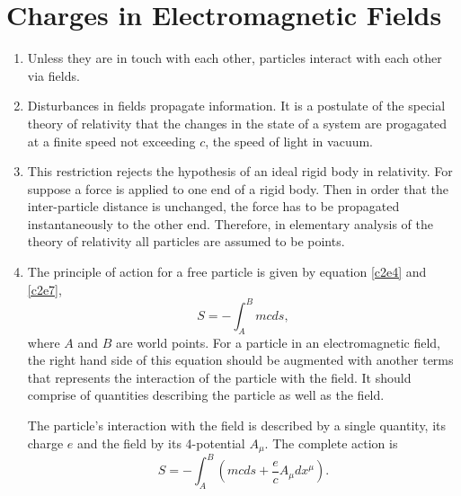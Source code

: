 \chapter{Charges in Electromagnetic Fields}\label{c3}
\begin{enumerate}
\item Unless they are in touch with each other, particles interact with each
other via fields.

\item Disturbances in fields propagate information. It is a postulate of the 
special theory of relativity that the changes in the state of a system are
progagated at a finite speed not exceeding $c$, the speed of light in vacuum.

\item This restriction rejects the hypothesis of an ideal rigid body in 
relativity. For suppose a force is applied to one end of a rigid body. Then in 
order that the inter-particle distance is unchanged, the force has to be 
propagated instantaneously to the other end. Therefore, in elementary analysis 
of the theory of relativity all particles are assumed to be points.

\item The principle of action for a free particle is given by equation 
\eqref{c2e4} and \eqref{c2e7},
\begin{equation}\label{c3e1}
S = -\int_{A}^{B}mcds,
\end{equation}
where $A$ and $B$ are world points.
For a particle in an electromagnetic field, the right hand side of this equation
should be augmented with another terms that represents the interaction of the
particle with the field. It should comprise of quantities describing the 
particle as well as the field.

The particle's interaction with the field is described by a single quantity, its
charge $e$ and the field by its 4-potential $A_\mu$. The complete action is
\begin{equation}\label{c3e2}
S = -\int_A^B \left(mcds + \frac{e}{c}A_\mu dx^\mu\right).
\end{equation}


\end{enumerate}
